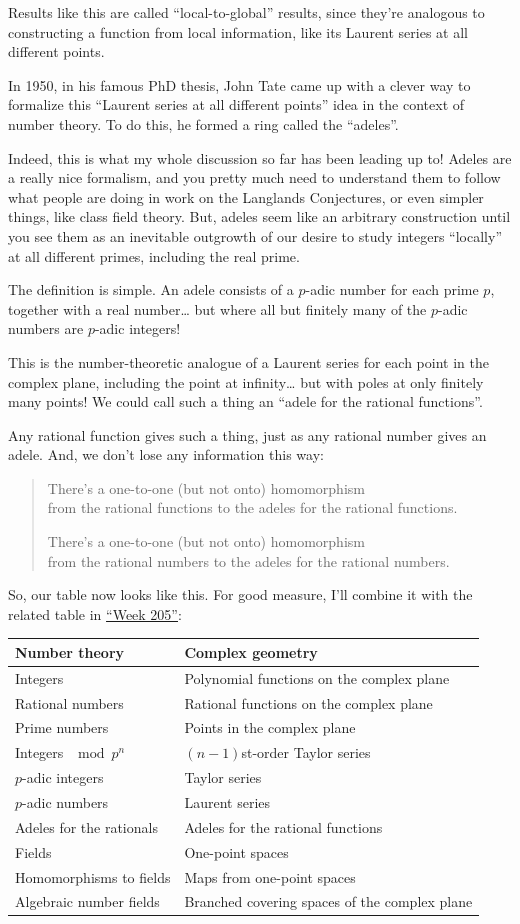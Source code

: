 \documentclass{article}
\begin{document}
Results like this are called ``local-to-global'' results, since they're
analogous to constructing a function from local information, like its
Laurent series at all different points.

In 1950, in his famous PhD thesis, John Tate came up with a clever way
to formalize this ``Laurent series at all different points'' idea in the
context of number theory. To do this, he formed a ring called the
``adeles''.

Indeed, this is what my whole discussion so far has been leading up to!
Adeles are a really nice formalism, and you pretty much need to
understand them to follow what people are doing in work on the Langlands
Conjectures, or even simpler things, like class field theory. But,
adeles seem like an arbitrary construction until you see them as an
inevitable outgrowth of our desire to study integers ``locally'' at all
different primes, including the real prime.

The definition is simple. An adele consists of a \(p\)-adic number for
each prime \(p\), together with a real number\ldots{} but where all but
finitely many of the \(p\)-adic numbers are \(p\)-adic integers!

This is the number-theoretic analogue of a Laurent series for each point
in the complex plane, including the point at infinity\ldots{} but with
poles at only finitely many points! We could call such a thing an
``adele for the rational functions''.

Any rational function gives such a thing, just as any rational number
gives an adele. And, we don't lose any information this way:

\begin{quote}
There's a one-to-one (but not onto) homomorphism\\
from the rational functions to the adeles for the rational functions.

There's a one-to-one (but not onto) homomorphism\\
from the rational numbers to the adeles for the rational numbers.
\end{quote}

So, our table now looks like this. For good measure, I'll combine it
with the related table in \protect\hyperlink{week205}{``Week 205''}:

\begin{longtable}[]{@{}ll@{}}
\toprule
Number theory & Complex geometry\tabularnewline
\midrule
\endhead
Integers & Polynomial functions on the complex plane\tabularnewline
Rational numbers & Rational functions on the complex
plane\tabularnewline
Prime numbers & Points in the complex plane\tabularnewline
Integers \(\mod p^n\) & \((n-1)\)st-order Taylor series\tabularnewline
\(p\)-adic integers & Taylor series\tabularnewline
\(p\)-adic numbers & Laurent series\tabularnewline
Adeles for the rationals & Adeles for the rational
functions\tabularnewline
Fields & One-point spaces\tabularnewline
Homomorphisms to fields & Maps from one-point spaces\tabularnewline
Algebraic number fields & Branched covering spaces of the complex
plane\tabularnewline
\bottomrule
\end{longtable}
\end{document}
